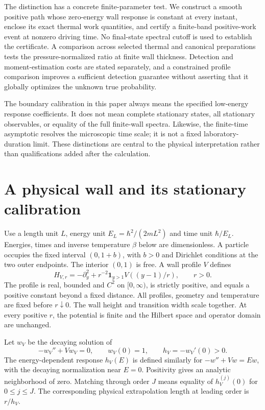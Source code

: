 \documentclass[aps,pra,reprint,superscriptaddress,longbibliography]{revtex4-2}
\begin{document}
The distinction has a concrete finite-parameter test. We construct a smooth positive path whose zero-energy wall response is constant at every instant, enclose its exact thermal work quantities, and certify a finite-band positive-work event at nonzero driving time. No final-state spectral cutoff is used to establish the certificate. A comparison across selected thermal and canonical preparations tests the pressure-normalized ratio at finite wall thickness. Detection and moment-estimation costs are stated separately, and a constrained profile comparison improves a sufficient detection guarantee without asserting that it globally optimizes the unknown true probability.

The boundary calibration in this paper always means the specified low-energy response coefficients. It does not mean complete stationary states, all stationary observables, or equality of the full finite-wall spectra. Likewise, the finite-time asymptotic resolves the microscopic time scale; it is not a fixed laboratory-duration limit. These distinctions are central to the physical interpretation rather than qualifications added after the calculation.

\section{A physical wall and its stationary calibration}

Use a length unit $L$, energy unit $E_L=\hbar^2/(2mL^2)$ and time unit $\hbar/E_L$. Energies, times and inverse temperature $\beta$ below are dimensionless. A particle occupies the fixed interval $(0,1+b)$, with $b>0$ and Dirichlet conditions at the two outer endpoints. The interior $(0,1)$ is free. A wall profile $V$ defines
\begin{equation}
 H_{V,r}=-\partial_y^2+r^{-2}\mathbf1_{y>1}V((y-1)/r),
 \qquad r>0.\label{eq:interval}
\end{equation}
The profile is real, bounded and $C^2$ on $[0,\infty)$, is strictly positive, and equals a positive constant beyond a fixed distance. All profiles, geometry and temperature are fixed before $r\downarrow0$. The wall height and transition width scale together. At every positive $r$, the potential is finite and the Hilbert space and operator domain are unchanged.

Let $w_V$ be the decaying solution of
\begin{equation}
 -w_V''+Vw_V=0,\qquad w_V(0)=1,
 \qquad h_V=-w_V'(0)>0.\label{eq:wallsolution}
\end{equation}
The energy-dependent response $h_V(E)$ is defined similarly for $-w''+Vw=Ew$, with the decaying normalization near $E=0$. Positivity gives an analytic neighborhood of zero. Matching through order $J$ means equality of $h_V^{(j)}(0)$ for $0\le j\le J$. The corresponding physical extrapolation length at leading order is $r/h_V$.
\end{document}
